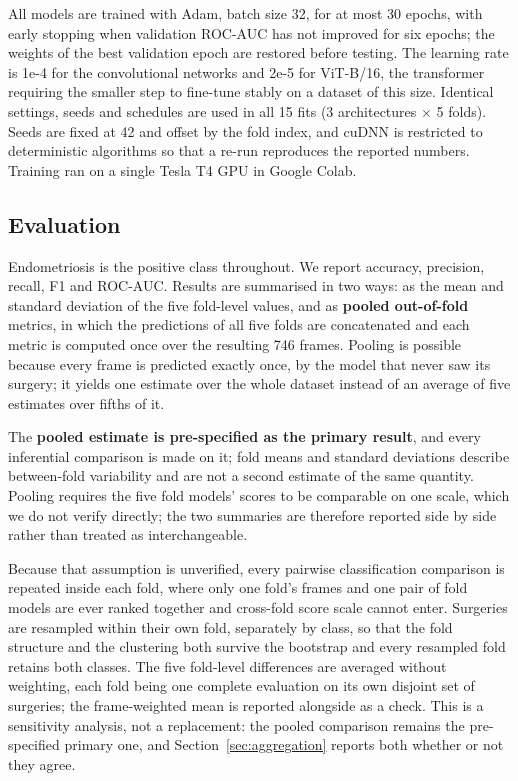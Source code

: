 \documentclass[preprint,12pt]{elsarticle}
\begin{document}
All models are trained with Adam, batch size 32, for at most 30 epochs, with early stopping when validation ROC-AUC has not improved for six epochs; the weights of the best validation epoch are restored before testing. The learning rate is 1e-4 for the convolutional networks and 2e-5 for ViT-B/16, the transformer requiring the smaller step to fine-tune stably on a dataset of this size. Identical settings, seeds and schedules are used in all 15 fits (3 architectures $\times$ 5 folds). Seeds are fixed at 42 and offset by the fold index, and cuDNN is restricted to deterministic algorithms so that a re-run reproduces the reported numbers. Training ran on a single Tesla T4 GPU in Google Colab.

\subsection{Evaluation}
\label{sec:evaluation}

Endometriosis is the positive class throughout. We report accuracy, precision, recall, F1 and ROC-AUC. Results are summarised in two ways: as the mean and standard deviation of the five fold-level values, and as \textbf{pooled out-of-fold} metrics, in which the predictions of all five folds are concatenated and each metric is computed once over the resulting 746 frames. Pooling is possible because every frame is predicted exactly once, by the model that never saw its surgery; it yields one estimate over the whole dataset instead of an average of five estimates over fifths of it.

The \textbf{pooled estimate is pre-specified as the primary result}, and every inferential comparison is made on it; fold means and standard deviations describe between-fold variability and are not a second estimate of the same quantity. Pooling requires the five fold models' scores to be comparable on one scale, which we do not verify directly; the two summaries are therefore reported side by side rather than treated as interchangeable.

Because that assumption is unverified, every pairwise classification comparison is repeated inside each fold, where only one fold's frames and one pair of fold models are ever ranked together and cross-fold score scale cannot enter. Surgeries are resampled within their own fold, separately by class, so that the fold structure and the clustering both survive the bootstrap and every resampled fold retains both classes. The five fold-level differences are averaged without weighting, each fold being one complete evaluation on its own disjoint set of surgeries; the frame-weighted mean is reported alongside as a check. This is a sensitivity analysis, not a replacement: the pooled comparison remains the pre-specified primary one, and Section~\ref{sec:aggregation} reports both whether or not they agree.
\end{document}
